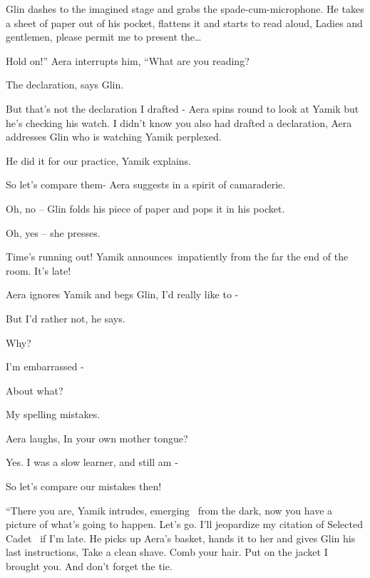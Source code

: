 \documentclass[letterpaper]{article}
\begin{document}
Glin dashes to the imagined stage and grabs the{ }spade-cum-microphone. He takes a sheet of paper out of
his pocket, flattens it and starts to read aloud, {\textquotedbl}Ladies and gentlemen, please permit me to present
the{\dots} {\textquotedbl} 

{\textquotedbl}Hold on!'' Aera interrupts him, ``What are you reading?{\textquotedbl} 

{\textquotedbl}The declaration,{\textquotedbl} says Glin. 

{\textquotedbl}But that's not the declaration I drafted -{\textquotedbl} Aera spins round to look at Yamik but he's
checking his watch. {\textquotedbl}I didn't know you also had drafted a declaration,{\textquotedbl} Aera addresses Glin
who is watching Yamik perplexed.

{\textquotedbl}He did it for our practice,{\textquotedbl} Yamik explains. 

{\textquotedbl}So let's compare them-{\textquotedbl} Aera suggests in a spirit of camaraderie.

{\textquotedbl}Oh, no --{\textquotedbl} Glin folds his piece of paper and pops it in his pocket.

{\textquotedbl}Oh, yes --{\textquotedbl} she presses.

{\textquotedbl}Time's running out!{\textquotedbl} Yamik announces~impatiently from the far the end of the room.
{\textquotedbl}It's late!{\textquotedbl}

Aera ignores Yamik and begs Glin, {\textquotedbl}I'd really like to -{\textquotedbl} 

{\textquotedbl}But I'd rather not,{\textquotedbl} he says. 

{\textquotedbl}Why?{\textquotedbl} 

{\textquotedbl}I'm embarrassed -{\textquotedbl} 

{\textquotedbl}About what?{\textquotedbl}~ 

{\textquotedbl}My spelling mistakes.{\textquotedbl} 

Aera laughs, {\textquotedbl}In your own mother tongue?{\textquotedbl} 

{\textquotedbl}Yes. I was a slow learner, and still am -{\textquotedbl} 

{\textquotedbl}So let's compare our mistakes then!{\textquotedbl} 

{}``There you are,{\textquotedbl} Yamik intrudes, emerging \ from the dark, {\textquotedbl}now you have a picture of
what's going to happen. Let's go. I'll jeopardize my citation of Selected Cadet \ if I'm late.{\textquotedbl} He picks
up Aera's basket, hands it to her and gives Glin his last instructions, {\textquotedbl}Take a clean shave. Comb your
hair. Put on the jacket I brought you. And don't forget the tie.{\textquotedbl} 
\end{document}
